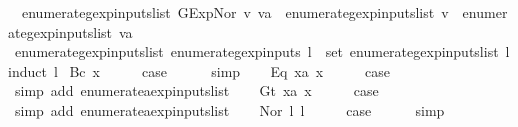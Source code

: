 \begin{isabellebody}
\ \ {\isachardoublequoteopen}enumerate{\isacharunderscore}gexp{\isacharunderscore}inputs{\isacharunderscore}list\ {\isacharparenleft}GExp{\isachardot}Nor\ v\ va{\isacharparenright}\ {\isacharequal}\ enumerate{\isacharunderscore}gexp{\isacharunderscore}inputs{\isacharunderscore}list\ v\ {\isacharat}\ enumerate{\isacharunderscore}gexp{\isacharunderscore}inputs{\isacharunderscore}list\ va{\isachardoublequoteclose}\isanewline
\isanewline
{}\isamarkupfalse%
\ enumerate{\isacharunderscore}gexp{\isacharunderscore}inputs{\isacharunderscore}list{\isacharcolon}\ {\isachardoublequoteopen}enumerate{\isacharunderscore}gexp{\isacharunderscore}inputs\ l\ {\isacharequal}\ set\ {\isacharparenleft}enumerate{\isacharunderscore}gexp{\isacharunderscore}inputs{\isacharunderscore}list\ l{\isacharparenright}{\isachardoublequoteclose}\isanewline
%
\isadelimproof
%
\endisadelimproof
%
\isatagproof
{}\isamarkupfalse%
{\isacharparenleft}induct\ l{\isacharparenright}\isanewline
{}\isamarkupfalse%
\ {\isacharparenleft}Bc\ x{\isacharparenright}\isanewline
\ \ \isamarkupfalse%
\ \isamarkupfalse%
\ {\isacharquery}case\isanewline
\ \ \ \ \isamarkupfalse%
\ simp\isanewline
{}\isamarkupfalse%
\isanewline
\ \ \isamarkupfalse%
\ {\isacharparenleft}Eq\ x{}a\ x{}{\isacharparenright}\isanewline
\ \ \isamarkupfalse%
\ \isamarkupfalse%
\ {\isacharquery}case\ \isanewline
\ \ \ \ \isamarkupfalse%
\ {\isacharparenleft}simp\ add{\isacharcolon}\ enumerate{\isacharunderscore}aexp{\isacharunderscore}inputs{\isacharunderscore}list{\isacharparenright}\isanewline
{}\isamarkupfalse%
\isanewline
\ \ \isamarkupfalse%
\ {\isacharparenleft}Gt\ x{}a\ x{}{\isacharparenright}\isanewline
\ \ \isamarkupfalse%
\ \isamarkupfalse%
\ {\isacharquery}case\isanewline
\ \ \ \ \isamarkupfalse%
\ {\isacharparenleft}simp\ add{\isacharcolon}\ enumerate{\isacharunderscore}aexp{\isacharunderscore}inputs{\isacharunderscore}list{\isacharparenright}\isanewline
{}\isamarkupfalse%
\isanewline
\ \ \isamarkupfalse%
\ {\isacharparenleft}Nor\ l{}\ l{}{\isacharparenright}\isanewline
\ \ \isamarkupfalse%
\ \isamarkupfalse%
\ {\isacharquery}case\isanewline
\ \ \ \ \isamarkupfalse%
\ simp\isanewline
{}\isamarkupfalse%
\isanewline

\end{isabellebody}
